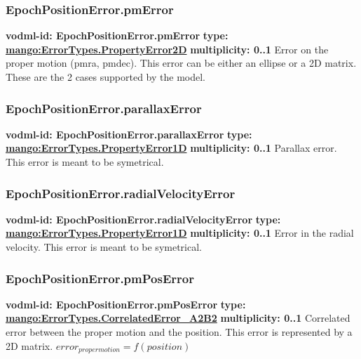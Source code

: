     \subsubsection{EpochPositionError.pmError}
      \textbf{vodml-id: EpochPositionError.pmError} \newline
      \textbf{type: \hyperref[sect:ErrorTypes.PropertyError2D]{mango:ErrorTypes.PropertyError2D}} \newline
      \textbf{multiplicity: 0..1} \newline
      Error on the proper motion (pmra, pmdec). This error can be either an ellipse or a 2D matrix. These are the 2 cases supported by the model.

    \subsubsection{EpochPositionError.parallaxError}
      \textbf{vodml-id: EpochPositionError.parallaxError} \newline
      \textbf{type: \hyperref[sect:ErrorTypes.PropertyError1D]{mango:ErrorTypes.PropertyError1D}} \newline
      \textbf{multiplicity: 0..1} \newline
      Parallax error. This error is meant to be symetrical.

    \subsubsection{EpochPositionError.radialVelocityError}
      \textbf{vodml-id: EpochPositionError.radialVelocityError} \newline
      \textbf{type: \hyperref[sect:ErrorTypes.PropertyError1D]{mango:ErrorTypes.PropertyError1D}} \newline
      \textbf{multiplicity: 0..1} \newline
      Error in the radial velocity. This error is meant to be symetrical.

    \subsubsection{EpochPositionError.pmPosError}
      \textbf{vodml-id: EpochPositionError.pmPosError} \newline
      \textbf{type: \hyperref[sect:ErrorTypes.CorrelatedError_A2B2]{mango:ErrorTypes.CorrelatedError\_A2B2}} \newline
      \textbf{multiplicity: 0..1} \newline
      Correlated error between the proper motion and the position. This error is represented by a 2D matrix. $error_{propermotion} = f(position)$

